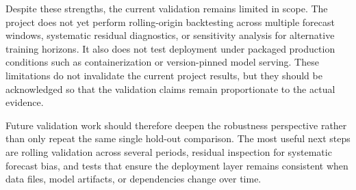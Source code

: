 Despite these strengths, the current validation remains limited in scope. The project does not yet perform rolling-origin backtesting across multiple forecast windows, systematic residual diagnostics, or sensitivity analysis for alternative training horizons. It also does not test deployment under packaged production conditions such as containerization or version-pinned model serving. These limitations do not invalidate the current project results, but they should be acknowledged so that the validation claims remain proportionate to the actual evidence.

Future validation work should therefore deepen the robustness perspective rather than only repeat the same single hold-out comparison. The most useful next steps are rolling validation across several periods, residual inspection for systematic forecast bias, and tests that ensure the deployment layer remains consistent when data files, model artifacts, or dependencies change over time.

%
